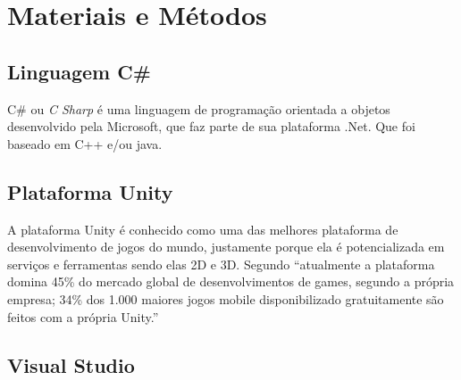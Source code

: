 
\chapter{Materiais e Métodos}

\section{Linguagem C\#}

C\# ou \textit{C Sharp} é uma linguagem de programação orientada a objetos desenvolvido pela Microsoft, que faz parte de sua plataforma .Net. Que foi baseado em C++ e/ou java.

\section{Plataforma Unity}

A plataforma Unity é conhecido como uma das melhores plataforma de desenvolvimento de jogos do mundo, justamente porque ela é potencializada em serviços e ferramentas sendo elas 2D e 3D.
Segundo  \enquote{atualmente a plataforma domina 45\% do mercado global de desenvolvimentos de games, segundo a própria empresa; 34\% dos 1.000 maiores jogos mobile disponibilizado gratuitamente são feitos com a própria Unity.}

\section{Visual Studio}

